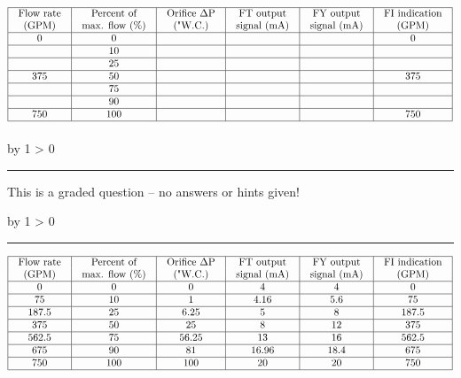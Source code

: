 \documentclass[12pt,a4paper]{article}
\def\svar{
           \advance\answnum by 1
           \ifnum \answnum > 0
                \hrule
                \vskip 3pt
                \leftline{Svar \the\answnum}
                \vskip 3pt \fi}
\def\notes{
           \advance\explnum by 1
           \ifnum \explnum > 0
                \hrule
                \vskip 3pt
                \leftline{Notes \the\explnum}
                \vskip 3pt \fi}
\begin{document}

$$\vbox{\offinterlineskip
\halign{\strut
\vrule \quad\hfil # \ \hfil & 
\vrule \quad\hfil # \ \hfil & 
\vrule \quad\hfil # \ \hfil & 
\vrule \quad\hfil # \ \hfil & 
\vrule \quad\hfil # \ \hfil & 
\vrule \quad\hfil # \ \hfil \vrule \cr
\noalign{\hrule}
%
Flow rate & Percent of & Orifice $\Delta$P & FT output & FY output & FI indication \cr
%
(GPM) & max. flow (\%) & ("W.C.) & signal (mA) & signal (mA) & (GPM) \cr
%
\noalign{\hrule}
%
0 & 0 &   &   &   & 0 \cr
%
\noalign{\hrule}
%
  & 10 &   &   &   &  \cr
%
\noalign{\hrule}
%
  & 25 &   &   &   &  \cr
%
\noalign{\hrule}
%
375 & 50 &   &   &   & 375 \cr
%
\noalign{\hrule}
%
  & 75 &   &   &   &  \cr
%
\noalign{\hrule}
%
  & 90 &   &   &   &  \cr
%
\noalign{\hrule}
%
750 & 100 &   &   &   & 750 \cr
%
\noalign{\hrule}
} %
}$$ %

\vfil

\eject
\vskip 10pt \filbreak 





\svar{} 

This is a graded question -- no answers or hints given!

\vskip 10pt \filbreak 





\notes{} 


$$\vbox{\offinterlineskip
\halign{\strut
\vrule \quad\hfil # \ \hfil & 
\vrule \quad\hfil # \ \hfil & 
\vrule \quad\hfil # \ \hfil & 
\vrule \quad\hfil # \ \hfil & 
\vrule \quad\hfil # \ \hfil & 
\vrule \quad\hfil # \ \hfil \vrule \cr
\noalign{\hrule}
%
Flow rate & Percent of & Orifice $\Delta$P & FT output & FY output & FI indication \cr
%
(GPM) & max. flow (\%) & ("W.C.) & signal (mA) & signal (mA) & (GPM) \cr
%
\noalign{\hrule}
%
0 & 0 & 0 & 4 & 4 & 0 \cr
%
\noalign{\hrule}
%
75  & 10 & 1 & 4.16 & 5.6 & 75 \cr
%
\noalign{\hrule}
%
187.5  & 25 & 6.25 & 5 & 8 & 187.5 \cr
%
\noalign{\hrule}
%
375 & 50 & 25 & 8 & 12 & 375 \cr
%
\noalign{\hrule}
%
562.5 & 75 & 56.25 & 13 & 16 & 562.5 \cr
%
\noalign{\hrule}
%
675 & 90 & 81 & 16.96 & 18.4 & 675 \cr
%
\noalign{\hrule}
%
750 & 100 & 100 & 20 & 20 & 750 \cr
%
\noalign{\hrule}
} %
}$$ %
\end{document}
